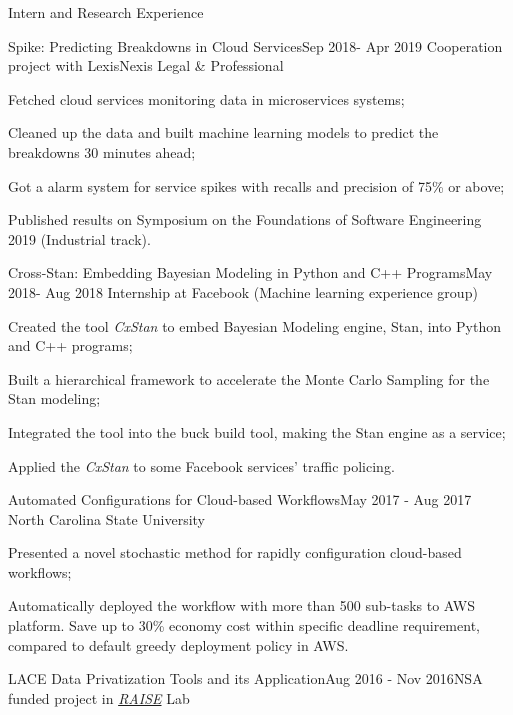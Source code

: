 \documentclass{resume} %
\begin{document}
\begin{rSection}{Intern and Research Experience}
\begin{rSubsection}{Spike: Predicting Breakdowns in Cloud Services}{Sep 2018- Apr 2019}
{Cooperation project with LexisNexis Legal \& Professional}{}
\item Fetched cloud services monitoring data in microservices systems;
\item Cleaned up the data and built machine learning models to predict the breakdowns 30 minutes ahead;
\item Got a alarm system for service spikes with recalls and precision of 75\% or above;
\item Published results on Symposium on the Foundations of Software Engineering 2019 (Industrial track).
\end{rSubsection}


\begin{rSubsection}{Cross-Stan: Embedding Bayesian Modeling in Python and C++ Programs}{May 2018- Aug 2018}
{Internship at Facebook (Machine learning experience group)}{}
\item Created the tool {\it CxStan} to embed Bayesian Modeling engine, Stan, into Python and C++ programs;
\item Built a hierarchical framework to accelerate the  Monte Carlo Sampling for the Stan modeling;
\item Integrated the tool into the buck build tool, making the Stan engine as a service;
\item Applied the {\it CxStan} to some Facebook services' traffic policing.
\end{rSubsection}

\begin{rSubsection}{Automated Configurations for Cloud-based Workflows}{May 2017 - Aug 2017}
{North Carolina State University}{}
\item Presented a novel stochastic method for rapidly configuration cloud-based workflows;
\item Automatically deployed the workflow with more than 500 sub-tasks to AWS platform. Save up to 30\% economy cost within specific deadline requirement, compared to default greedy deployment policy in AWS.
\end{rSubsection}

\begin{rSubsection}{LACE Data Privatization Tools and its Application}{Aug 2016 - Nov 2016}{NSA funded project in \href{http://ai4se.net/index}{\textit{RAISE}} Lab}{}


\end{rSubsection}
\end{rSection}
\end{document}
